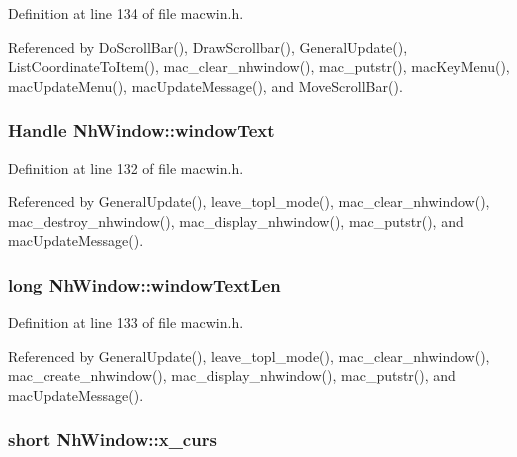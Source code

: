 Definition at line 134 of file macwin.\+h.



Referenced by Do\+Scroll\+Bar(), Draw\+Scrollbar(), General\+Update(), List\+Coordinate\+To\+Item(), mac\+\_\+clear\+\_\+nhwindow(), mac\+\_\+putstr(), mac\+Key\+Menu(), mac\+Update\+Menu(), mac\+Update\+Message(), and Move\+Scroll\+Bar().

\hypertarget{structNhWindow_a24bc4dcae5833a3e4a53fd6313380c1f}{
\subsubsection[{window\+Text}]{\setlength{\rightskip}{0pt plus 5cm}Handle Nh\+Window\+::window\+Text}}\label{structNhWindow_a24bc4dcae5833a3e4a53fd6313380c1f}


Definition at line 132 of file macwin.\+h.



Referenced by General\+Update(), leave\+\_\+topl\+\_\+mode(), mac\+\_\+clear\+\_\+nhwindow(), mac\+\_\+destroy\+\_\+nhwindow(), mac\+\_\+display\+\_\+nhwindow(), mac\+\_\+putstr(), and mac\+Update\+Message().

\hypertarget{structNhWindow_a5705364a1f7bdbf0d56b1c420c3d5fdc}{
\subsubsection[{window\+Text\+Len}]{\setlength{\rightskip}{0pt plus 5cm}long Nh\+Window\+::window\+Text\+Len}}\label{structNhWindow_a5705364a1f7bdbf0d56b1c420c3d5fdc}


Definition at line 133 of file macwin.\+h.



Referenced by General\+Update(), leave\+\_\+topl\+\_\+mode(), mac\+\_\+clear\+\_\+nhwindow(), mac\+\_\+create\+\_\+nhwindow(), mac\+\_\+display\+\_\+nhwindow(), mac\+\_\+putstr(), and mac\+Update\+Message().

\hypertarget{structNhWindow_ab56661eb993dd6ee08d94c6d81175452}{
\subsubsection[{x\+\_\+curs}]{\setlength{\rightskip}{0pt plus 5cm}short Nh\+Window\+::x\+\_\+curs}}\label{structNhWindow_ab56661eb993dd6ee08d94c6d81175452}


